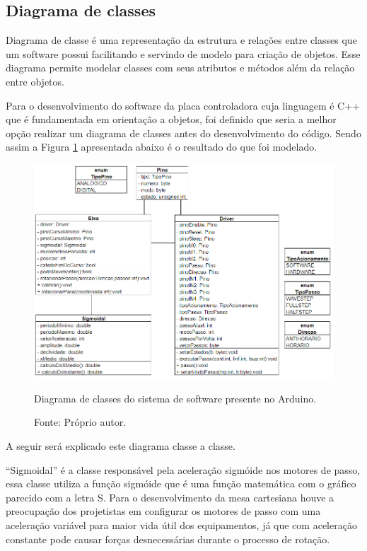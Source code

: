 \subsection{Diagrama de classes}\label{subsec:metdiagrama}

Diagrama de classe é uma representação da estrutura e relações entre classes que um software possui 
facilitando e servindo de modelo para criação de objetos. Esse diagrama permite modelar classes com seus 
atributos e métodos além da relação entre objetos.

Para o desenvolvimento do software da placa controladora cuja linguagem é C++ que é fundamentada em 
orientação a objetos, foi definido que seria a melhor opção realizar um diagrama de classes antes do 
desenvolvimento do código. Sendo assim a Figura \ref{fig:diagramaclasses} apresentada abaixo é 
o resultado do que foi modelado.

\begin{landscape}
\begin{figure}[!htb]
\centering
\includegraphics[scale = 0.8]{figuras/3-21}
\caption{Diagrama de classes do sistema de software presente no Arduino.}
\caption*{Fonte: Próprio autor.}
\label{fig:diagramaclasses}
\end{figure}
\end{landscape}

A seguir será explicado este diagrama classe a classe.

“Sigmoidal” é a classe responsável pela aceleração sigmóide nos motores de passo, essa classe utiliza 
a função sigmóide que é uma função matemática com o gráfico parecido com a letra S. Para o desenvolvimento 
da mesa cartesiana houve a preocupação dos projetistas em configurar os motores de passo com uma aceleração 
variável para maior vida útil dos equipamentos, já que com aceleração constante pode causar forças 
desnecessárias durante o processo de rotação.


